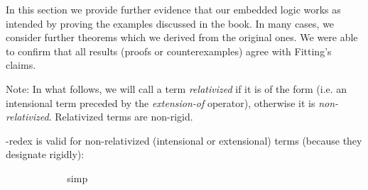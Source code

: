 %
\begin{isabellebody}%
%
%
\isadelimtheory
%
\endisadelimtheory
%
\isatagtheory
%
\endisatagtheory
{\isafoldtheory}%
%
\isadelimtheory
%
\endisadelimtheory
%
\isamarkuptrue%
%
\begin{isamarkuptext}%
In this section we provide further evidence that our embedded logic works as intended by proving the examples discussed in the book.
 In many cases, we consider further theorems which we derived from the original ones. We were able to confirm that all results
 (proofs or counterexamples) agree with Fitting's claims.%
\end{isamarkuptext}\isamarkuptrue%
%
\isamarkuptrue%
%
\begin{isamarkuptext}%
Note: In what follows, we will call a term \emph{relativized} if it is of the form \isa{{\isasymdown}{\isasymphi}}
(i.e. an intensional term preceded by the \emph{extension-of} operator), otherwise it is \emph{non-relativized}.
Relativized terms are non-rigid.%
\end{isamarkuptext}\isamarkuptrue%
%
\isamarkuptrue%
%
\begin{isamarkuptext}%
\isa{{\isasymbeta}{\isasymeta}}-redex is valid for non-relativized (intensional or extensional) terms (because they designate rigidly):%
\end{isamarkuptext}\isamarkuptrue%
\isamarkupfalse%
\ {\isachardoublequoteopen}{\isasymlfloor}{\isacharparenleft}{\isacharparenleft}{\isasymlambda}{\isasymalpha}{\isachardot}\ {\isasymphi}\ {\isasymalpha}{\isacharparenright}\ \ {\isacharparenleft}{\isasymtau}{\isacharcolon}{\isacharcolon}{\isasymup}{\isasymzero}{\isacharparenright}{\isacharparenright}\ \isactrlbold {\isasymleftrightarrow}\ {\isacharparenleft}{\isasymphi}\ \ {\isasymtau}{\isacharparenright}{\isasymrfloor}{\isachardoublequoteclose}%
\isadelimproof
\ %
\endisadelimproof
%
\isatagproof
{}\isamarkupfalse%
\ simp%
\endisatagproof
{\isafoldproof}%
%
\isadelimproof
%
\endisadelimproof
\isanewline
{}\isamarkupfalse%
\ {\isachardoublequoteopen}{\isasymlfloor}{\isacharparenleft}{\isacharparenleft}{\isasymlambda}{\isasymalpha}{\isachardot}\ {\isasymphi}\ {\isasymalpha}{\isacharparenright}\ \ {\isacharparenleft}{\isasymtau}{\isacharcolon}{\isacharcolon}{\isasymzero}{\isacharparenright}{\isacharparenright}\ \isactrlbold {\isasymleftrightarrow}\ {\isacharparenleft}{\isasymphi}\ \ {\isasymtau}{\isacharparenright}{\isasymrfloor}{\isachardoublequoteclose}%

\end{isabellebody}
